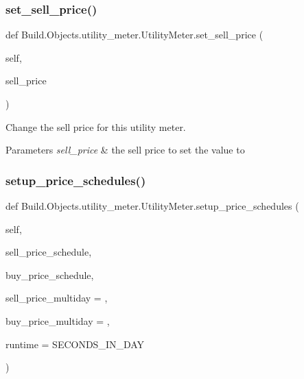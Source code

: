 \subsubsection{\texorpdfstring{set\+\_\+sell\+\_\+price()}{set\_sell\_price()}}
{\footnotesize\ttfamily def Build.\+Objects.\+utility\+\_\+meter.\+Utility\+Meter.\+set\+\_\+sell\+\_\+price (\begin{DoxyParamCaption}\item[{}]{self,  }\item[{}]{sell\+\_\+price }\end{DoxyParamCaption})}



Change the sell price for this utility meter. 


\begin{DoxyParams}{Parameters}
{\em sell\+\_\+price} & the sell price to set the value to \\
\hline
\end{DoxyParams}
\mbox{\label{class_build_1_1_objects_1_1utility__meter_1_1_utility_meter_a197ab2ab7f5abe14619a2ae15898b074}} 
\subsubsection{\texorpdfstring{setup\+\_\+price\+\_\+schedules()}{setup\_price\_schedules()}}
{\footnotesize\ttfamily def Build.\+Objects.\+utility\+\_\+meter.\+Utility\+Meter.\+setup\+\_\+price\+\_\+schedules (\begin{DoxyParamCaption}\item[{}]{self,  }\item[{}]{sell\+\_\+price\+\_\+schedule,  }\item[{}]{buy\+\_\+price\+\_\+schedule,  }\item[{}]{sell\+\_\+price\+\_\+multiday = {},  }\item[{}]{buy\+\_\+price\+\_\+multiday = {},  }\item[{}]{runtime = {\ttfamily SECONDS\+\_\+IN\+\_\+DAY} }\end{DoxyParamCaption})}



